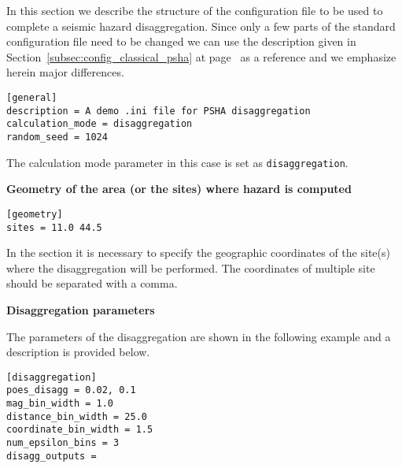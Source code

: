 In this section we describe the structure of the configuration file to be used
to complete a seismic hazard disaggregation. Since only a few parts of the
standard configuration file need to be changed we can use the description
given in Section~\ref{subsec:config_classical_psha} at
page~\pageref{subsec:config_classical_psha} as a reference and we emphasize
herein major differences.

\begin{verbatim}
[general]
description = A demo .ini file for PSHA disaggregation
calculation_mode = disaggregation
random_seed = 1024
\end{verbatim}

The calculation mode parameter in this case is set as
\texttt{disaggregation}.

\textbf{Geometry of the area (or the sites) where hazard is computed}

\begin{verbatim}
[geometry]
sites = 11.0 44.5
\end{verbatim}

In the section it is necessary to specify the geographic coordinates of
the site(s) where the disaggregation will be performed. The coordinates
of multiple site should be separated with a comma.

\textbf{Disaggregation parameters}

The parameters of the disaggregation are shown in the following example and
a description is provided below.

\begin{verbatim}
[disaggregation]
poes_disagg = 0.02, 0.1
mag_bin_width = 1.0
distance_bin_width = 25.0
coordinate_bin_width = 1.5
num_epsilon_bins = 3
disagg_outputs =
\end{verbatim}

